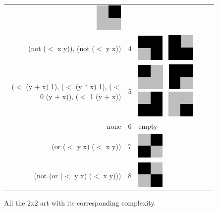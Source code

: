 \documentclass[11pt]{article}
\begin{document}
\begin{figure}
\begin{center}
\begin{tabular}{r c l}
    \includegraphics[width=.25in]{../presentation/2x2/Shape4LVL3.png}\\
\tiny{(not ($<$ x y)), (not ($<$ y x))} & 4 & 
    \includegraphics[width=.25in]{../presentation/2x2/Shape2LVL4.png}~
    \includegraphics[width=.25in]{../presentation/2x2/Shape1LVL4.png} \\
\tiny{($<$ (y + x) 1), ($<$ (y * x) 1), ($<$ 0 (y + x)), ($<$ 1 (y + x))} & 5 & 
    \includegraphics[width=.25in]{../presentation/2x2/Shape2LVL5.png}~
    \includegraphics[width=.25in]{../presentation/2x2/Shape1LVL5.png}~
    \includegraphics[width=.25in]{../presentation/2x2/Shape3LVL5.png}~
    \includegraphics[width=.25in]{../presentation/2x2/Shape4LVL5.png} \\
\tiny{none} & 6 & empty \\
\tiny{(or ($<$ y  x) ($<$ x  y))} & 7 &
    \includegraphics[width=.25in]{../presentation/2x2/Shape1LVL7.png}\\
\tiny{(not (or ($<$ y  x) ($<$ x  y)))} & 8 &
    \includegraphics[width=.25in]{../presentation/2x2/Shape1LVL8.png}
\end{tabular}
\end{center}

\caption{All the 2x2 art with its corresponding complexity.}
\label{fig:2x2}
\end{figure}
\end{document}
